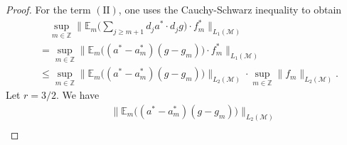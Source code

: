\documentclass[oneside,english,a4wide]{amsart}
\numberwithin{equation}{section}
\numberwithin{figure}{section}
\theoremstyle{plain}
\theoremstyle{plain}
\theoremstyle{definition}
\theoremstyle{plain}
\theoremstyle{remark}
\theoremstyle{definition}
\theoremstyle{remark}
\theoremstyle{definition}
\newcommand{\8}{\infty}
\begin{document}
\begin{proof}
	For the term $(\text{II})$,
	one uses the Cauchy-Schwarz inequality to obtain
	\begin{equation*}
		\begin{aligned}
			{}&\quad\sup_{m\in\mathbb{Z}}\biggl\|\mathbb{E}_{m}\biggl(\sum_{j\ge m+1}d_ja^*\cdot d_jg\biggr)\cdot f_m^*\biggr\|_{L_1(\mathcal{M})}\\
			&
			=\sup_{m\in\mathbb{Z}}\big\|\mathbb{E}_{m}\big((a^*-a^*_m)(g-g_m)\big)\cdot f_m^*\big\|_{L_1(\mathcal{M})}\\
			&\le \sup_{m\in\mathbb{Z}}\big\|\mathbb{E}_{m}\big((a^*-a^*_m)(g-g_m)\big)\big\|_{L_2(\mathcal{M})}\cdot \sup_{m\in\mathbb{Z}}\|f_m\|_{L_2(\mathcal{M})}.
		\end{aligned}
	\end{equation*}
	Let $r=3/2$. We have
	\begin{equation*}
		\begin{aligned}
			{}&\quad\big\|\mathbb{E}_{m}\big((a^*-a^*_m)(g-g_m)\big)\big\|_{L_2(\mathcal{M})}\\

\end{aligned}
\end{equation*}
\end{proof}
\end{document}
